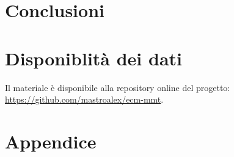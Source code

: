 \textcolor{blue}{\lipsum[1-4]}





\section{Conclusioni}

\textcolor{blue}{\lipsum[1-2]}


\raggedbottom


\raggedbottom
\pagebreak
\section*{Disponiblità dei dati}

Il materiale è disponibile alla repository online del progetto: \url{https://github.com/mastroalex/ecm-mmt}.

\printbibliography[title=Riferimenti]

\clearpage
\onecolumn
\section*{Appendice}

